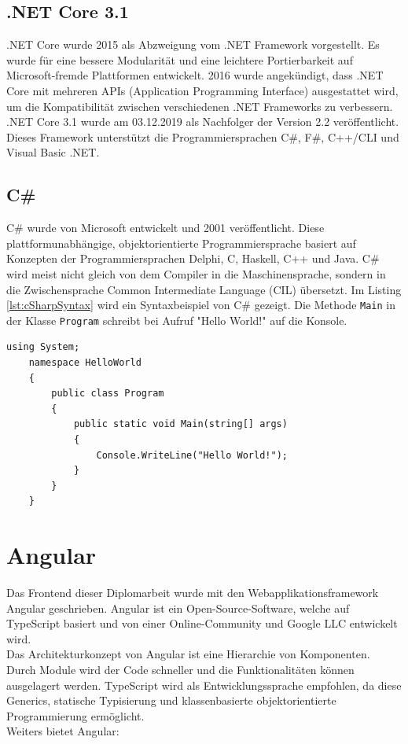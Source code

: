\subsection{.NET Core 3.1}
.NET Core wurde 2015 als Abzweigung vom .NET Framework vorgestellt. Es wurde für eine bessere Modularität und eine leichtere Portierbarkeit auf Microsoft-fremde Plattformen entwickelt. 2016 wurde angekündigt, dass .NET Core mit mehreren APIs (Application Programming Interface) ausgestattet wird, um die Kompatibilität zwischen verschiedenen .NET Frameworks zu verbessern. \autocite{wikiDotnet} \\
.NET Core 3.1 wurde am 03.12.2019 als Nachfolger der Version 2.2 veröffentlicht. Dieses Framework unterstützt die Programmiersprachen C\#, F\#, C++/CLI und Visual Basic .NET. \autocite{wikiDotnetCore}

\subsection{C\#}
C\# wurde von Microsoft entwickelt und 2001 veröffentlicht. Diese plattformunabhängige, objektorientierte Programmiersprache basiert auf Konzepten der Programmiersprachen Delphi, C, Haskell, C++ und Java.
C\# wird meist nicht gleich von dem Compiler in die Maschinensprache, sondern in die Zwischensprache Common Intermediate Language (CIL) übersetzt. Im Listing \ref{lst:cSharpSyntax} wird ein Syntaxbeispiel von C\# gezeigt. Die Methode \texttt{Main} in der Klasse \texttt{Program} schreibt bei Aufruf "Hello World!" auf die Konsole. \autocite{wikiCSharp}

\begin{lstlisting}[caption={C\#-Syntaxbeispiel}, language={[Sharp]C},label={lst:cSharpSyntax}]
	using System;
	namespace HelloWorld
	{
		public class Program
		{
			public static void Main(string[] args)
			{
				Console.WriteLine("Hello World!");
			}
		}
	}
\end{lstlisting}
\section{Angular}
Das Frontend dieser Diplomarbeit wurde mit den Webapplikationsframework Angular geschrieben. Angular ist ein Open-Source-Software, welche auf TypeScript basiert und von einer Online-Community und Google LLC entwickelt wird.\\
Das Architekturkonzept von Angular ist eine Hierarchie von Komponenten. Durch Module wird der Code schneller und die Funktionalitäten können ausgelagert werden. TypeScript wird als Entwicklungssprache empfohlen, da diese Generics, statische Typisierung und klassenbasierte objektorientierte Programmierung ermöglicht. \autocite{wikiAngular}\\
Weiters bietet Angular:

